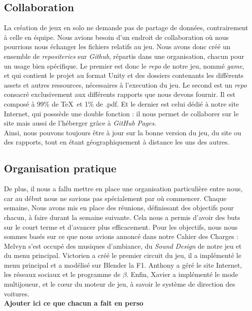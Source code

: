 \documentclass[12pt,a4paper]{article}
\begin{document}
\subsection{Collaboration}
La création de jeux en solo ne demande pas de partage de données, contrairement à celle en équipe. Nous avions besoin d'un endroit de collaboration où nous pourrions nous échanger les fichiers relatifs au jeu. 
Nous avons donc créé un ensemble de \textit{repositeries} sur \textit{Github}, répartis dans une organisation, chacun pour un usage bien spécifique.
Le premier est donc le \textit{repo} de notre jeu, nommé \textit{game}, et qui contient le projet au format Unity et des dossiers contenants les différents assets et autres ressources, nécessaires à l'execution du jeu. 
Le second est un \textit{repo} consacré exclusivement aux différents rapports que nous devons fournir. Il est composé à 99\% de \TeX\, et 1\% de .pdf.
Et le dernier est celui dédié à notre site Internet, qui posssède une double fonction : il nous permet de collaborer sur le site mais aussi de l'héberger grâce à \textit{GitHub Pages}.\\
\indent Ainsi, nous pouvons toujours être à jour sur la bonne version du jeu, du site ou des rapports, tout en étant géographiquement à distance les uns des autres.

\subsection{Organisation pratique}
De plus, il nous a fallu mettre en place une organisation particulière entre nous, car au début nous ne savions pas spécialement par où commencer.
Chaque semaine, Nous avons mis en place %
 des réunions, définissant des objectifs pour chacun, à faire durant la semaine suivante. Cela nous a permis d’avoir des buts sur le court terme et d'avancer plus efficacement. Pour les objectifs, nous nous sommes basés sur ce que nous avions annoncé dans notre Cahier des 
  Charges :
  Melvyn s'est occupé des musiques d'ambiance, du \textit{Sound Design} de 
  notre jeu et du menu principal. Victorien a créé le premier circuit du jeu,
  il a implémenté le menu principal et a modélisé sur Blender la F1. Anthony a
  géré le site Internet, les réseaux sociaux et le programme de \(\beta\).
  Enfin, Xavier a implémenté le mode multijoueur, et le cœur du moteur de jeu,
  à savoir le système de direction des voitures.\\
  {\bfseries Ajouter ici ce que chacun a fait en perso}
\end{document}
